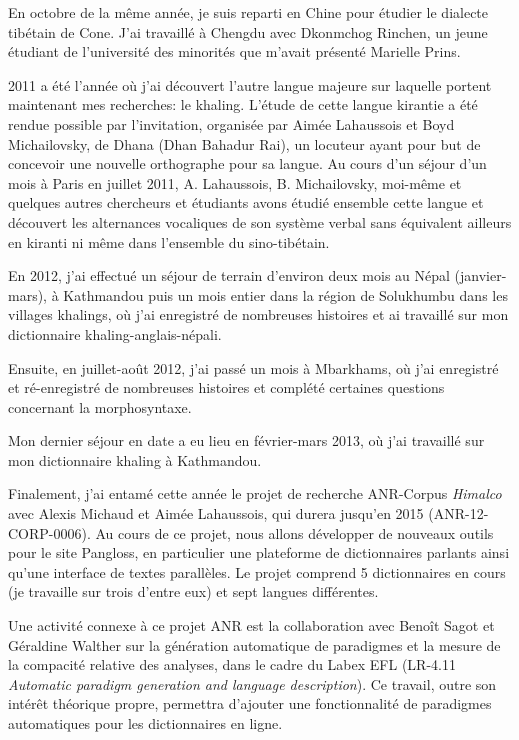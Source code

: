 \documentclass[oldfontcommands,oneside,a4paper,11pt]{memoir}
\begin{document}
En octobre de la même année, je suis reparti en Chine pour étudier le dialecte tibétain de Cone. J'ai travaillé à Chengdu avec Dkonmchog Rinchen, un jeune étudiant de l'université des minorités que m'avait présenté Marielle Prins.

2011 a   été l'année où j'ai découvert l'autre langue majeure sur laquelle portent maintenant mes recherches: le khaling. L'étude de cette langue kirantie a été rendue possible par l'invitation, organisée par Aimée Lahaussois et Boyd Michailovsky, de Dhana (Dhan Bahadur Rai), un locuteur ayant pour but de concevoir une nouvelle orthographe pour sa langue. Au cours d'un séjour d'un mois à Paris en juillet 2011, A. Lahaussois, B. Michailovsky, moi-même et quelques autres chercheurs et étudiants avons étudié ensemble cette langue et découvert les alternances vocaliques de son système verbal sans équivalent ailleurs en kiranti ni même dans l'ensemble du sino-tibétain.


En 2012, j'ai effectué un séjour de terrain d'environ deux mois au Népal (janvier-mars), à Kathmandou puis un mois entier dans la région de Solukhumbu dans les villages khalings, où j'ai enregistré de nombreuses histoires et ai travaillé sur mon dictionnaire khaling-anglais-népali.  

Ensuite, en juillet-août 2012, j'ai passé un mois à Mbarkhams, où j'ai enregistré et ré-enregistré de nombreuses histoires et complété certaines questions concernant la morphosyntaxe.

Mon dernier séjour en date a eu lieu en février-mars 2013, où j'ai travaillé sur mon dictionnaire khaling à Kathmandou. 

Finalement, j'ai entamé cette année le projet de recherche ANR-Corpus \textit{Himalco} avec Alexis Michaud et Aimée Lahaussois, qui durera jusqu'en 2015 (ANR-12-CORP-0006). Au cours de ce projet, nous allons développer de nouveaux outils pour le site Pangloss, en particulier une plateforme de dictionnaires parlants ainsi qu'une interface de textes parallèles. Le projet comprend 5 dictionnaires en cours (je travaille sur trois d'entre eux) et sept langues différentes.

Une activité connexe à ce projet ANR est la collaboration avec Benoît Sagot et Géraldine Walther sur la génération automatique de paradigmes et la mesure de la compacité relative des analyses, dans le cadre du Labex EFL (LR-4.11 \textit{Automatic paradigm generation and language description}). Ce travail, outre son intérêt théorique propre, permettra d'ajouter une fonctionnalité de paradigmes automatiques pour les dictionnaires en ligne.
 
\end{document}
